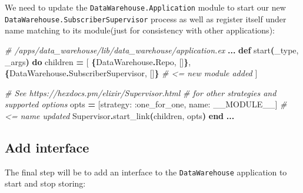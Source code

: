 \documentclass[
  oneside]{book}
\newenvironment{Shaded}{\begin{snugshade}}{\end{snugshade}}
\newcommand{\CommentTok}[1]{\textcolor[rgb]{0.56,0.35,0.01}{\textit{#1}}}
\newcommand{\ConstantTok}[1]{\textcolor[rgb]{0.56,0.35,0.01}{#1}}
\newcommand{\FunctionTok}[1]{\textcolor[rgb]{0.13,0.29,0.53}{\textbf{#1}}}
\newcommand{\KeywordTok}[1]{\textcolor[rgb]{0.13,0.29,0.53}{\textbf{#1}}}
\newcommand{\NormalTok}[1]{#1}
\newcommand{\OperatorTok}[1]{\textcolor[rgb]{0.81,0.36,0.00}{\textbf{#1}}}
\newcommand{\OtherTok}[1]{\textcolor[rgb]{0.56,0.35,0.01}{#1}}
\newcommand{\VariableTok}[1]{\textcolor[rgb]{0.00,0.00,0.00}{#1}}
\begin{document}
We need to update the \texttt{DataWarehouse.Application} module to start our new\\
\texttt{DataWarehouse.SubscriberSupervisor} process as well as register itself under name matching to its module(just for consistency with other applications):

\begin{Shaded}
\begin{Highlighting}[]
  \CommentTok{\# /apps/data\_warehouse/lib/data\_warehouse/application.ex}
  \OperatorTok{...}
  \KeywordTok{def}\NormalTok{ start}\FunctionTok{(}\NormalTok{\_type, \_args}\FunctionTok{)} \KeywordTok{do}
\NormalTok{    children }\OperatorTok{=} \OtherTok{[}
      \FunctionTok{\{}\ConstantTok{DataWarehouse}\OperatorTok{.}\ConstantTok{Repo}\NormalTok{, }\OtherTok{[]}\FunctionTok{\}}\NormalTok{,}
      \FunctionTok{\{}\ConstantTok{DataWarehouse}\OperatorTok{.}\ConstantTok{SubscriberSupervisor}\NormalTok{, }\OtherTok{[]}\FunctionTok{\}} \CommentTok{\# \textless{}= new module added}
    \OtherTok{]}

    \CommentTok{\# See https://hexdocs.pm/elixir/Supervisor.html}
    \CommentTok{\# for other strategies and supported options}
\NormalTok{    opts }\OperatorTok{=} \OtherTok{[}\VariableTok{strategy:} \VariableTok{:one\_for\_one}\NormalTok{, }\VariableTok{name:} \ConstantTok{\_\_MODULE\_\_}\OtherTok{]} \CommentTok{\# \textless{}= name updated}
    \ConstantTok{Supervisor}\OperatorTok{.}\NormalTok{start\_link}\FunctionTok{(}\NormalTok{children, opts}\FunctionTok{)}
  \KeywordTok{end}
  \OperatorTok{...}
\end{Highlighting}
\end{Shaded}

\subsection{Add interface}\label{add-interface}

The final step will be to add an interface to the \texttt{DataWarehouse} application to start and stop storing:
\end{document}
